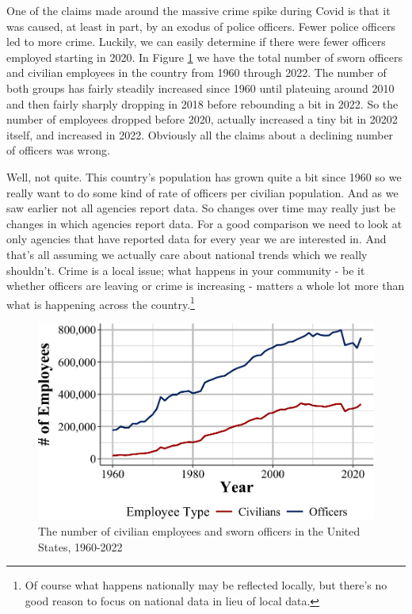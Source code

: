 \documentclass[
  12pt,
  openany]{book}
\begin{document}
One of the claims made around the massive crime spike during Covid is that it was caused, at least in part, by an exodus of police officers. Fewer police officers led to more crime. Luckily, we can easily determine if there were fewer officers employed starting in 2020. In Figure \ref{fig:leokaNationalEmployees} we have the total number of sworn officers and civilian employees in the country from 1960 through 2022. The number of both groups has fairly steadily increased since 1960 until plateuing around 2010 and then fairly sharply dropping in 2018 before rebounding a bit in 2022. So the number of employees dropped before 2020, actually increased a tiny bit in 20202 itself, and increased in 2022. Obviously all the claims about a declining number of officers was wrong.

Well, not quite. This country's population has grown quite a bit since 1960 so we really want to do some kind of rate of officers per civilian population. And as we saw earlier not all agencies report data. So changes over time may really just be changes in which agencies report data. For a good comparison we need to look at only agencies that have reported data for every year we are interested in. And that's all assuming we actually care about national trends which we really shouldn't. Crime is a local issue; what happens in your community - be it whether officers are leaving or crime is increasing - matters a whole lot more than what is happening across the country.\footnote{Of course what happens nationally may be reflected locally, but there's no good reason to focus on national data in lieu of local data.}

\begin{figure}

{\centering \includegraphics[width=0.9\linewidth]{07_leoka_files/figure-latex/leokaNationalEmployees-1} 

}

\caption{The number of civilian employees and sworn officers in the United States, 1960-2022}\label{fig:leokaNationalEmployees}
\end{figure}
\end{document}
